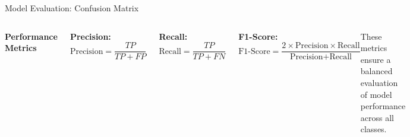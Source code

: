 \begin{frame}{Model Evaluation: Confusion Matrix}

    \begin{columns}

        \textbf{Performance Metrics}
        \vspace{10pt}
        
        \textbf{Precision:} 
        \[
        \text{Precision} = \frac{TP}{TP + FP}
        \]
        
        \textbf{Recall:} 
        \[
        \text{Recall} = \frac{TP}{TP + FN}
        \]

        \textbf{F1-Score:}
        \[
        \text{F1-Score} = \frac{2 \times \text{Precision} \times \text{Recall}}{\text{Precision} + \text{Recall}}
        \]

        \vspace{5pt}
        These metrics ensure a balanced evaluation of model performance across all classes.

        \centering
        \includegraphics[width=0.9\linewidth]{images/paper_3/confusion matrix samples.png} %

    \end{columns}

\end{frame}




